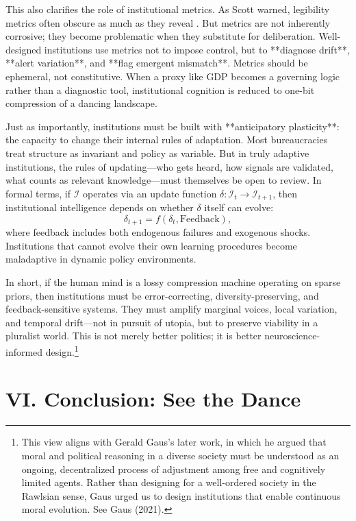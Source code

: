 \documentclass[12pt]{article}  %
\begin{document}
This also clarifies the role of institutional metrics. As Scott warned, legibility metrics often obscure as much as they reveal \parencite{scott1998seeing}. But metrics are not inherently corrosive; they become problematic when they substitute for deliberation. Well-designed institutions use metrics not to impose control, but to **diagnose drift**, **alert variation**, and **flag emergent mismatch**. Metrics should be ephemeral, not constitutive. When a proxy like GDP becomes a governing logic rather than a diagnostic tool, institutional cognition is reduced to one-bit compression of a dancing landscape.

Just as importantly, institutions must be built with **anticipatory plasticity**: the capacity to change their internal rules of adaptation. Most bureaucracies treat structure as invariant and policy as variable. But in truly adaptive institutions, the rules of updating—who gets heard, how signals are validated, what counts as relevant knowledge—must themselves be open to review. In formal terms, if \( \mathcal{I} \) operates via an update function \( \delta: \mathcal{I}_t \rightarrow \mathcal{I}_{t+1} \), then institutional intelligence depends on whether \( \delta \) itself can evolve:
\[
\delta_{t+1} = f(\delta_t, \text{Feedback}),
\]
where feedback includes both endogenous failures and exogenous shocks. Institutions that cannot evolve their own learning procedures become maladaptive in dynamic policy environments.

In short, if the human mind is a lossy compression machine operating on sparse priors, then institutions must be error-correcting, diversity-preserving, and feedback-sensitive systems. They must amplify marginal voices, local variation, and temporal drift—not in pursuit of utopia, but to preserve viability in a pluralist world. This is not merely better politics; it is better neuroscience-informed design.\footnote{This view aligns with Gerald Gaus's later work, in which he argued that moral and political reasoning in a diverse society must be understood as an ongoing, decentralized process of adjustment among free and cognitively limited agents. Rather than designing for a well-ordered society in the Rawlsian sense, Gaus urged us to design institutions that enable continuous moral evolution. See Gaus (2021).}

\section*{VI. Conclusion: See the Dance}
\end{document}
